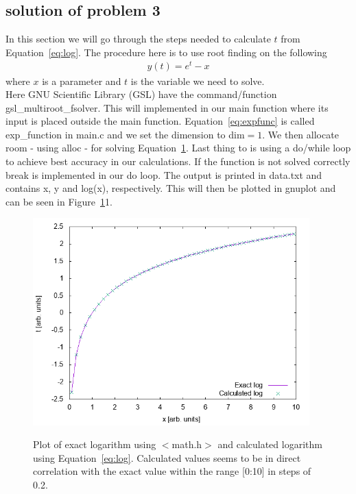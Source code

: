 \documentclass[a4paper,oneside,onecolumn,article,10pt]{memoir}
\begin{document}
\subsection*{solution of problem 3}
In this section we will go through the steps needed to calculate $t$ from Equation~\ref{eq:log}. The procedure here is to use root finding on the following
\begin{align}\label{eq:expfunc}
y(t)=e^t-x
\end{align}
where $x$ is a parameter and $t$ is the variable we need to solve. \\
Here GNU Scientific Library (GSL) have the command/function gsl\_multiroot\_fsolver. This will implemented in our main function where its input is placed outside the main function. Equation~\ref{eq:expfunc} is called exp\_function in main.c and we set the dimension to dim$=1$. We then allocate room - using alloc - for solving Equation~\ref{fig:exponentialfunction}. Last thing to is using a do/while loop to achieve best accuracy in our calculations. If the function is not solved correctly break is implemented in our do loop. The output is printed in data.txt and contains x, y and log(x), respectively. This will then be plotted in gnuplot and can be seen in Figure~\ref{fig:exponentialfunction}1. 
\FloatBarrier
\begin{figure}
\centering
\includegraphics[width=0.95\textwidth]{plot.pdf}
\label{fig:exponentialfunction}
\caption{Plot of exact logarithm using $<$math.h$>$ and calculated logarithm using Equation~\ref{eq:log}. Calculated values seems to be in direct correlation with the exact value within the range [0:10] in steps of 0.2.}
\end{figure}
\FloatBarrier
\end{document}
